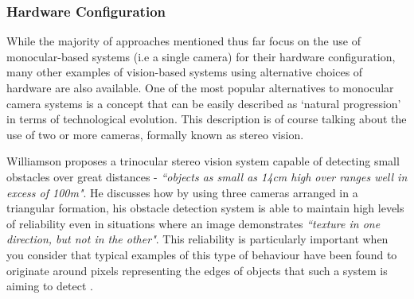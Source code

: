 %
%

\subsubsection{Hardware Configuration}
 
While the majority of approaches mentioned thus far focus on the use of monocular-based systems (i.e a single camera) for their hardware configuration, many other examples of vision-based systems using alternative choices of hardware are also available. One of the most popular alternatives to monocular camera systems is a concept that can be easily described as `natural progression' in terms of technological evolution. This description is of course talking about the use of two or more cameras, formally known as stereo vision. 

Williamson \cite{williamson} proposes a trinocular stereo vision system capable of detecting small obstacles over great distances - \textit{``objects as small as 14cm high over ranges well in excess of 100m"}. He discusses how by using three cameras arranged in a triangular formation, his obstacle detection system is able to maintain high levels of reliability even in situations where an image demonstrates \textit{``texture in one direction, but not in the other"}. This reliability is particularly important when you consider that typical examples of this type of behaviour have been found to originate around pixels representing the edges of objects that such a system is aiming to detect \cite{williamson}. 

